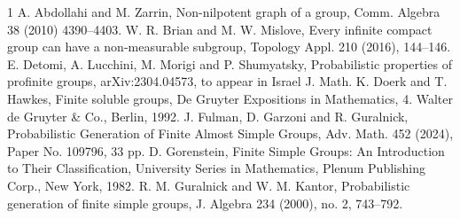 \documentclass{amsart}
\numberwithin{equation}{section}
\begin{document}
\begin{thebibliography}{1}
	 A. Abdollahi and M. Zarrin, {Non-nilpotent graph of a group}, Comm. Algebra 38 (2010) 4390--4403.
	 W. R. Brian and M. W. Mislove,
	Every infinite compact group can have a non-measurable subgroup,
	Topology Appl. 210 (2016), 144–146.
	 E. Detomi, A. Lucchini, M. Morigi and   P. Shumyatsky,
	Probabilistic properties of profinite groups, arXiv:2304.04573, to appear in Israel J. Math.
	 K.	Doerk and T. Hawkes, Finite soluble groups, De Gruyter Expositions in Mathematics, 4. Walter de Gruyter \& Co., Berlin, 1992. 
	J. Fulman, D. Garzoni and R. Guralnick, Probabilistic Generation of Finite Almost Simple Groups, 
Adv. Math. 452 (2024), Paper No. 109796, 33 pp.
    D. Gorenstein, Finite Simple Groups: An Introduction to Their Classification, University Series in Mathematics, Plenum Publishing Corp., New York, 1982.
 R. M. Guralnick and W. M. Kantor, Probabilistic generation of finite simple groups,
J. Algebra 234 (2000), no. 2, 743–792.

\end{thebibliography}
\end{document}
